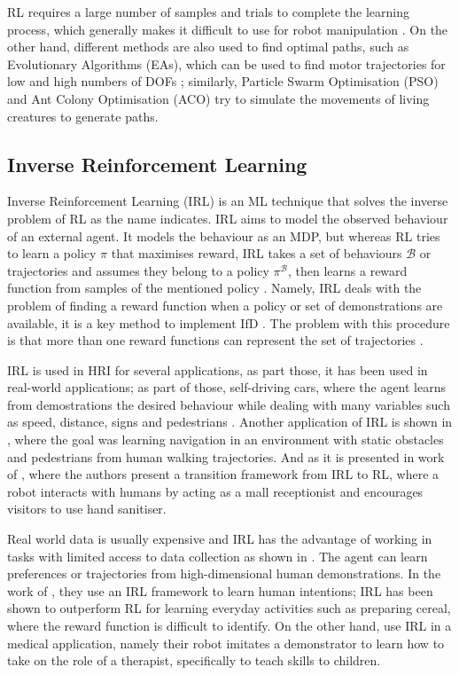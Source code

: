 \documentclass[thesis]{mas_proposal}
\begin{document}
    RL requires a large number of samples and trials to complete the learning process, which generally makes it difficult to use for robot manipulation \cite{Hua2021}. On the other hand, different methods are also used to find optimal paths, such as Evolutionary Algorithms (EAs), which can be used to find motor trajectories for low and high numbers of DOFs \cite{Nolfi2000}; similarly, Particle Swarm Optimisation (PSO) \cite{Zhang2015} and Ant Colony Optimisation (ACO) \cite{Zhang2010} try to simulate the movements of living creatures to generate paths.
    
    \subsection{Inverse Reinforcement Learning}
    
    Inverse Reinforcement Learning (IRL) is an ML technique that solves the inverse problem of RL as the name indicates. IRL aims to model the observed behaviour of an external agent. It models the behaviour as an MDP, but whereas RL tries to learn a policy $\pi$ that maximises reward, IRL takes a set of behaviours $\mathcal{B}$ or trajectories and assumes they belong to a policy $\pi^\mathcal{B}$, then learns a reward function from samples of the mentioned policy \cite{Heim2019}. Namely, IRL deals with the problem of finding a reward function when a policy or set of demonstrations are available, it is a key method to implement IfD \cite{Arora2021}. The problem with this procedure is that more than one reward functions can represent the set of trajectories \cite{Russell2000}. 
    
    IRL is used in HRI for several applications, as part those, it has been used in real-world applications; as part of those, self-driving cars, where the agent learns from demostrations the desired behaviour while dealing with many variables such as speed, distance, signs and pedestrians \cite{Arora2021} . Another application of IRL is shown in \cite{Kretzschmar2016}, where the goal was learning navigation in an environment with static obstacles and pedestrians from human walking trajectories. And as it is presented in work of \cite{Chen2023}, where the authors present a transition framework from IRL to RL, where a robot interacts with humans by acting as a mall receptionist and encourages visitors to use hand sanitiser. 
    
    Real world data is usually expensive and IRL has the advantage of working in tasks with limited access to data collection as shown in \cite{Chen2023}. The agent can learn preferences or trajectories from high-dimensional human demonstrations. In the work of \cite{Bhattacharyya2020}, they use an IRL framework to learn human intentions; IRL has been shown to outperform RL for learning everyday activities such as preparing cereal, where the reward function is difficult to identify. On the other hand, \cite{Hussein2019} use IRL in a medical application, namely their robot imitates a demonstrator to learn how to take on the role of a therapist, specifically to teach skills to children.  
    
\end{document}
